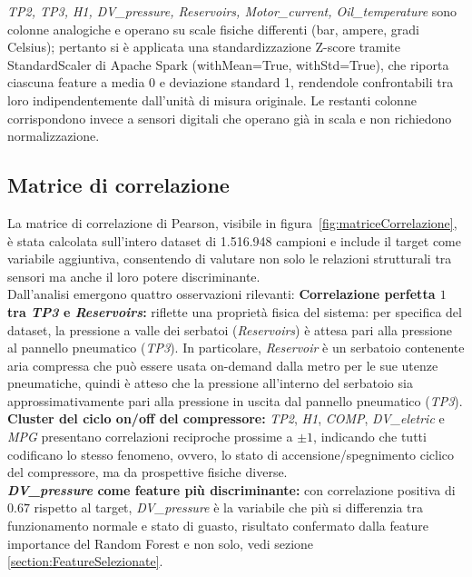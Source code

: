 \documentclass[../main.tex]{subfiles}
\begin{document}
\textit{TP2, TP3, H1, DV\_pressure, Reservoirs, Motor\_current, Oil\_temperature} sono colonne analogiche e operano su scale fisiche differenti (bar, ampere, gradi Celsius); pertanto si è applicata una standardizzazione Z-score tramite StandardScaler di Apache Spark (withMean=True, withStd=True), che riporta ciascuna feature a media 0 e deviazione standard 1, rendendole confrontabili tra loro indipendentemente dall'unità di misura originale. Le restanti colonne corrispondono invece a sensori digitali che operano già in scala e non richiedono normalizzazione.


\subsection{Matrice di correlazione}

La matrice di correlazione di Pearson, visibile in figura~\ref{fig:matriceCorrelazione}, è stata calcolata sull'intero dataset di 1.516.948 campioni e include il target come variabile aggiuntiva, consentendo di valutare non solo le relazioni strutturali tra sensori ma anche il loro potere discriminante.\\
\label{section:AnalisiCorrelazionePerfettaTP3Reservoir}
Dall'analisi emergono quattro osservazioni rilevanti:
\textbf{Correlazione perfetta $1$ tra \textit{TP3} e \textit{Reservoirs}:} riflette una proprietà fisica del sistema: per specifica del dataset, la pressione a valle dei serbatoi (\textit{Reservoirs}) è attesa pari alla pressione al pannello pneumatico (\textit{TP3}). In particolare, \textit{Reservoir} è un serbatoio contenente aria compressa che può essere usata on-demand dalla metro per le sue utenze pneumatiche, quindi è atteso che la pressione all'interno del serbatoio sia approssimativamente pari alla pressione in uscita dal pannello pneumatico (\textit{TP3}).\\

\textbf{Cluster del ciclo on/off del compressore:} \textit{TP2}, \textit{H1}, \textit{COMP}, \textit{DV\_eletric} e \textit{MPG} presentano correlazioni reciproche prossime a $\pm 1$, indicando che tutti codificano lo stesso fenomeno, ovvero, lo stato di accensione/spegnimento ciclico del compressore, ma da prospettive fisiche diverse.\\

\textbf{\textit{DV\_pressure} come feature più discriminante:} con correlazione positiva di $0.67$ rispetto al target, \textit{DV\_pressure} è la variabile che più si differenzia tra funzionamento normale e stato di guasto, risultato confermato dalla feature importance del Random Forest e non solo, vedi sezione \ref{section:FeatureSelezionate}.\\
\end{document}
